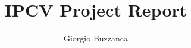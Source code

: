 \documentclass[12pt,a4paper,openany,oneside]{book}
\begin{document}



\title{IPCV Project Report}
\author{Giorgio Buzzanca}



\tableofcontents




\newpage
{}

\end{document}
